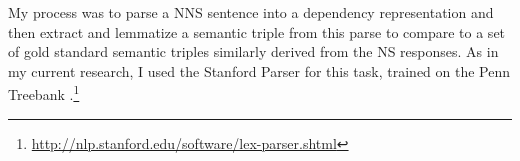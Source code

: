 My process was to parse a NNS sentence into a dependency representation
and then extract and lemmatize a semantic triple from this parse
to compare to a set of gold standard semantic triples similarly derived from the NS responses. As in my current research, I used the Stanford Parser for this task, trained on the Penn Treebank \citep{demarneffe:ea:06, klein:manning:03}.\footnote{\url{http://nlp.stanford.edu/software/lex-parser.shtml}} 




